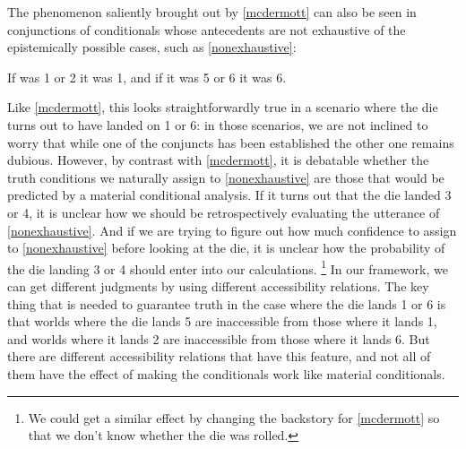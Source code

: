 \documentclass[If.tex]{subfiles}
\begin{document}
The phenomenon saliently brought out by \ref{mcdermott} can also be seen in conjunctions of conditionals whose antecedents are not exhaustive of the epistemically possible cases, such as \ref{nonexhaustive}:
\begin{prop}
	\nitem \label{nonexhaustive}
	If was 1 or 2 it was 1, and if it was 5 or 6 it was 6.
\end{prop}
Like \ref{mcdermott}, this looks straightforwardly true in a scenario where the die turns out to have landed on 1 or 6: in those scenarios, we are not inclined to worry that while one of the conjuncts has been established the other one remains dubious.  However, by contrast with \ref{mcdermott}, it is debatable whether the truth conditions we naturally assign to \ref{nonexhaustive} are those that would be predicted by a material conditional analysis.  If it turns out that the die landed 3 or 4, it is unclear how we should be retrospectively evaluating the utterance of \ref{nonexhaustive}.  And if we are trying to figure out how much confidence to assign to \ref{nonexhaustive} before looking at the die, it is unclear how the probability of the die landing 3 or 4 should enter into our calculations.%
\footnote{We could get a similar effect by changing the backstory for \ref{mcdermott} so that we don't know whether the die was rolled.}
In our framework, we can get different judgments by using different accessibility relations.  The key thing that is needed to guarantee truth in the case where the die lands 1 or 6 is that worlds where the die lands 5 are inaccessible from those where it lands 1, and worlds where it lands 2 are inaccessible from those where it lands 6.  But there are different accessibility relations that have this feature, and not all of them have the effect of making the conditionals work like material conditionals.%
\end{document}
